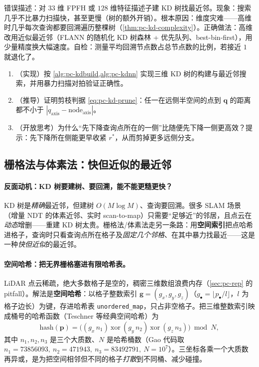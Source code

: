 \begin{pitfall}
错误描述：对 $33$ 维 FPFH 或 $128$ 维特征描述子建 KD 树找最近邻。现象：搜索几乎不比暴力扫描快，甚至更慢（树的额外开销）。根本原因：维度灾难——高维时几乎每次查询都要回溯遍历整棵树（\cref{thm:pc-kd-complexity}）。正确做法：高维改用近似最近邻（FLANN 的随机化 KD 树森林 + 优先队列、best-bin-first），用少量精度换大幅速度。自检：测量平均回溯节点数占总节点数的比例，若接近 $1$ 就退化了。
\end{pitfall}

\begin{practice}
\begin{enumerate}
  \item （实现）按 \cref{alg:pc-kdbuild,alg:pc-kdnn} 实现三维 KD 树的构建与最近邻搜索，并用暴力扫描对拍验证正确性。
  \item （推导）证明剪枝判据 \cref{eq:pc-kd-prune}：任一在远侧半空间的点到 $\mathbf{q}$ 的距离都不小于 $|q_{\text{axis}}-\text{node}_{\text{axis}}|$。
  \item （开放思考）为什么“先下降查询点所在的一侧”比随便先下降一侧更高效？提示：先下降所在侧能更早收紧 $r^\ast$，从而剪掉更多远侧分支。
\end{enumerate}
\end{practice}

\subsection{栅格法与体素法：快但近似的最近邻}
\label{sec:pc-gridnn}

\paragraph{反面动机：KD 树要建树、要回溯，能不能更糙更快？}
KD 树是\emph{精确}最近邻，但建树 $O(M\log M)$、查询要回溯。很多 SLAM 场景（增量 NDT 的体素近邻、实时 scan-to-map）只需要“足够近”的邻居，且点云在\emph{动态}增删——重建 KD 树太贵。栅格法/体素法走另一条路：用\textbf{空间索引}把点哈希进格子，查询时只看查询点所在格子及\emph{固定几个邻格}、在其中暴力找最近——这是一种\emph{快但近似}的最近邻\cite{gao2023slamad}。

\paragraph{空间哈希：把无界栅格塞进有限哈希表。}
LiDAR 点云稀疏，绝大多数格子是空的，稠密三维数组浪费内存（\cref{sec:pc-rep} 的 pitfall）。解法是\textbf{空间哈希}：以格子整数索引 $\mathbf{g}=(g_x,g_y,g_z)$（$g_\bullet=\lfloor p_\bullet/l\rfloor$，$l$ 为格子边长）为键，存进哈希表 \texttt{unordered\_map}，只占非空格子。把三维整数索引映成桶号的哈希函数（Teschner 等经典空间哈希\cite{gao2023slamad}）为
\begin{equation}
  \mathrm{hash}(\mathbf{p})=\big((g_x\,n_1)\ \mathrm{xor}\ (g_y\,n_2)\ \mathrm{xor}\ (g_z\,n_3)\big)\bmod N,
  \label{eq:pc-gridhash}
\end{equation}
其中 $n_1,n_2,n_3$ 是三个大质数、$N$ 是哈希桶数（Gao 代码取 $n_1{=}73856093,\ n_2{=}471943,\ n_3{=}83492791,\ N{=}10^7$）。三坐标各乘一个大质数再异或，是为把空间相邻但不同的格子\emph{打散}到不同桶、减少碰撞。

